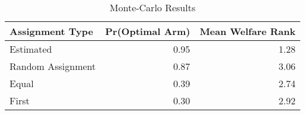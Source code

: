 
\begin{table}[H]
    \caption{Monte-Carlo Results}
\centering
\begin{tabular}{lrr}
\toprule
Assignment Type & Pr(Optimal Arm) & Mean Welfare Rank\\
\midrule
Estimated & 0.95 & 1.28\\
Random Assignment & 0.87 & 3.06\\
Equal & 0.39 & 2.74\\
First & 0.30 & 2.92\\
\bottomrule
\end{tabular}
\end{table}